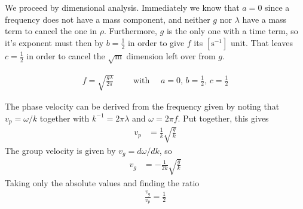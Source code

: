 We proceed by dimensional analysis. Immediately we know that $a = 0$ since a
frequency does not have a mass component, and neither $g$ nor ${\lambda}$ have a
mass term to cancel the one in $\rho $. Furthermore, $g$ is the only one with a
time term, so it's exponent must then by $b = \frac 12$ in order to give $f$
its $[\si{\s^{-1}}]$ unit. That leaves $c = \frac 12$ in order to cancel
the $\sqrt{\si{\m}}$ dimension left over from $g$.

\begin{align*}
    \boxed{
    f = \sqrt{\frac{g{\lambda}}{2{\pi} }}
	\quad\quad\text{ with }\quad a = 0,\, b = \frac 12,\, c = \frac 12
    }
\end{align*}

The phase velocity can be derived from the frequency given by noting that
$v_p = {\omega} /k$ together with $k^{-1} = 2{\pi} {\lambda}$ and ${\omega}  = 2{\pi} f$. Put together, this
gives
\begin{align*}
    v_p &= \frac{1}{k}\sqrt{\frac{g}{k}}
\end{align*}
The group velocity is given by $v_g = d{\omega} /dk$, so
\begin{align*}
    v_g &= -\frac{1}{2k}\sqrt{\frac{g}{k}}
\end{align*}
Taking only the absolute values and finding the ratio
\begin{align}
    \boxed{\frac{v_g}{v_p} = \frac 12}
\end{align}
